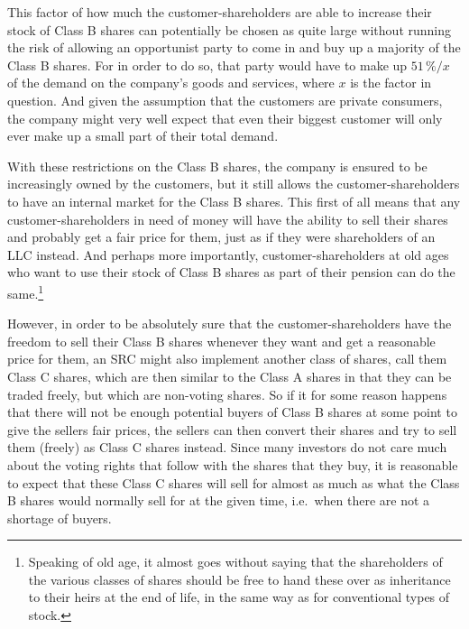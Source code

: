 \documentclass{article}
\begin{document}
This factor of how much the customer-shareholders are able to increase their stock of Class B shares can potentially be chosen as quite large without running the risk of allowing an opportunist party to come in and buy up a majority of the Class B shares. 
For in order to do so, that party would have to make up $51\,\% / x$ of the demand on the company's goods and services, where $x$ is the factor in question. And given the assumption that the customers are private consumers, the company might very well expect that even their biggest customer will only ever make up a small part of their total demand.




With these restrictions on the Class B shares, the company is ensured to be increasingly owned by the customers, but it still allows the customer-shareholders to have an internal market for the Class B shares. This first of all means that any customer-shareholders in need of money will have the ability to sell their shares and probably get a fair price for them, just as if they were shareholders of an LLC instead. And perhaps more importantly, customer-shareholders at old ages who want to use their stock of Class B shares as part of their pension can do the same.\footnote{
	Speaking of old age, it almost goes without saying that the shareholders of the various classes of shares should be free to hand these over as inheritance to their heirs at the end of life, in the same way as for conventional types of stock.
}

However, in order to be absolutely sure that the customer-shareholders have the freedom to sell their Class B shares whenever they want and get a reasonable price for them, an SRC might also implement another class of shares, call them Class C shares, which are then similar to the Class A shares in that they can be traded freely, but which are non-voting shares. So if it for some reason happens that there will not be enough potential buyers of Class B shares at some point to give the sellers fair prices, the sellers can then convert their shares and try to sell them (freely) as Class C shares instead. Since many investors do not care much about the voting rights that follow with the shares that they buy, it is reasonable to expect that these Class C shares will sell for almost as much as what the Class B shares would normally sell for at the given time, i.e.\ when there are not a shortage of buyers. 
\end{document}
